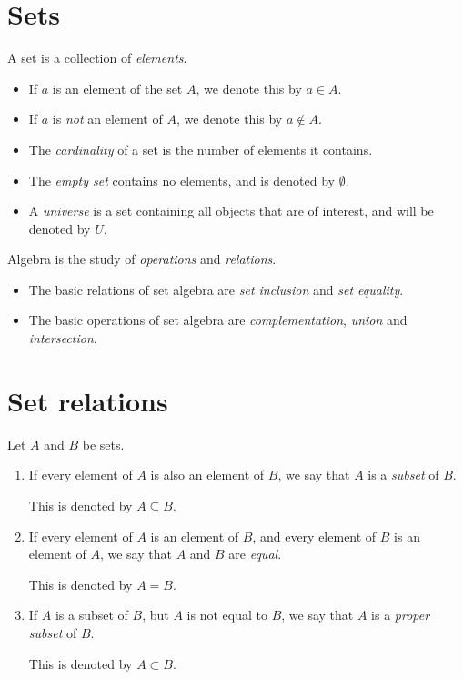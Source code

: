 \documentclass[lecture]{csm}
\def\it{\item}
\def\bit{\begin{itemize}}
\def\eit{\end{itemize}}
\def\ben{\begin{enumerate}}
\def\een{\end{enumerate}}
\begin{document}
\maketitle
\tableofcontents

\section{Sets}

A set is a collection of \emph{elements}.
\bit
\it If $a$ is an element of the set $A$, we denote this by $a\in A$.
\it If $a$ is \emph{not} an element of $A$, we denote this by $a\notin A$.
\it The \emph{cardinality} of a set is the number of elements it contains.
\it The \emph{empty set} contains no elements, and is denoted by $\emptyset$.
\it A \emph{universe} is a set containing all objects that are of interest, and will be denoted by $U$.
\eit

\par
Algebra is the study of \emph{operations} and \emph{relations}.
\bit
\it The basic relations of set algebra are \emph{set inclusion} and \emph{set equality}.
\it The basic operations of set algebra are \emph{complementation}, \emph{union} and \emph{intersection}.
\eit

\section{Set relations}

\begin{definition}
Let $A$ and $B$ be sets. 
\ben
\it If every element of $A$ is also an element of $B$, we say that $A$ is a \emph{subset} of $B$.
\par This is denoted by $A\subseteq B$.
\it If every element of $A$ is an element of $B$, and every element of $B$ is an element of $A$, we say that $A$ and $B$ are \emph{equal}. 
\par This is denoted by $A=B$.
\it If $A$ is a subset of $B$, but $A$ is not equal to $B$, we say that $A$ is a \emph{proper subset} of $B$. 
\par This is denoted by $A\subset B$.
\een
\end{definition}
\end{document}
